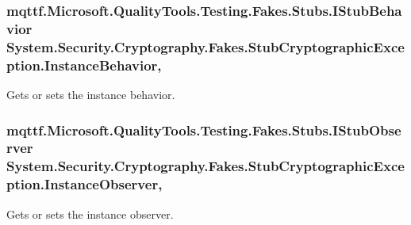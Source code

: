 \hypertarget{class_system_1_1_security_1_1_cryptography_1_1_fakes_1_1_stub_cryptographic_exception_a5a39dace4419ba3b836136ee2e7d1af8}{
\subsubsection[{Instance\-Behavior}]{\setlength{\rightskip}{0pt plus 5cm}mqttf.\-Microsoft.\-Quality\-Tools.\-Testing.\-Fakes.\-Stubs.\-I\-Stub\-Behavior System.\-Security.\-Cryptography.\-Fakes.\-Stub\-Cryptographic\-Exception.\-Instance\-Behavior\hspace{0.3cm}{\ttfamily [get]}, {\ttfamily [set]}}}\label{class_system_1_1_security_1_1_cryptography_1_1_fakes_1_1_stub_cryptographic_exception_a5a39dace4419ba3b836136ee2e7d1af8}


Gets or sets the instance behavior.

\hypertarget{class_system_1_1_security_1_1_cryptography_1_1_fakes_1_1_stub_cryptographic_exception_a0ff80e1c262c7cbf99b347a2463cd67a}{
\subsubsection[{Instance\-Observer}]{\setlength{\rightskip}{0pt plus 5cm}mqttf.\-Microsoft.\-Quality\-Tools.\-Testing.\-Fakes.\-Stubs.\-I\-Stub\-Observer System.\-Security.\-Cryptography.\-Fakes.\-Stub\-Cryptographic\-Exception.\-Instance\-Observer\hspace{0.3cm}{\ttfamily [get]}, {\ttfamily [set]}}}\label{class_system_1_1_security_1_1_cryptography_1_1_fakes_1_1_stub_cryptographic_exception_a0ff80e1c262c7cbf99b347a2463cd67a}


Gets or sets the instance observer.

